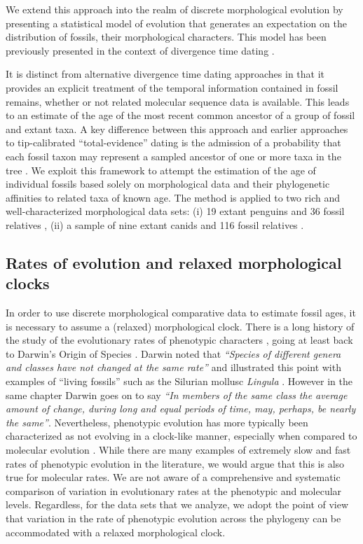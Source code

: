 \documentclass[11pt]{article}
\newcommand{\ncanidfossils}{{116}}
\begin{document}
We extend this approach into the realm of discrete morphological evolution by presenting a statistical model of evolution that generates an expectation on the distribution of fossils, their morphological characters. 
This model has been previously presented in the context of divergence time dating \cite{gavr2014,gavryushkina2015bayesian}. 

It is distinct from alternative divergence time dating approaches in that it provides an explicit treatment of the temporal information contained in fossil remains, whether or not related molecular sequence data is available. 
This leads to an estimate of the age of the most recent common ancestor of a group of fossil and extant taxa. A key difference between this approach and earlier approaches to tip-calibrated ``total-evidence'' dating \cite{Ronq2012} is the admission of a probability that each fossil taxon may represent a sampled ancestor of one or more taxa  in the tree \cite{gavr2014}.
We exploit this framework to attempt the estimation of the age of individual fossils based solely on morphological data and their phylogenetic affinities to related taxa of known age. 
The method is applied to two rich and well-characterized morphological data sets: (i) 
19 extant penguins and 36 fossil relatives \cite{ksepka2010,ksepka2012}, (ii) a sample of nine extant canids and \ncanidfossils{} fossil relatives \cite{Slater2015}.

\subsection*{Rates of evolution and relaxed morphological clocks}

In order to use discrete morphological comparative data to estimate fossil ages, it is necessary to assume a (relaxed) morphological clock. There is a long history of the study of the evolutionary rates of phenotypic characters \cite{Simpson1944,Haldane1949,Simpson1953,Gingerich1983,Gingerich1993}, going at least back to Darwin's Origin of Species \cite{Darwin1859}. Darwin noted that {\it ``Species of different genera and classes have not changed at the same rate''} and illustrated this point with examples of ``living fossils'' such as the Silurian mollusc {\it Lingula} \cite{Darwin1859}. However in the same chapter Darwin goes on to say {\it ``In members of the same class the average amount of change, during long and equal periods of time, may, perhaps, be nearly the same''}. Nevertheless, phenotypic evolution has more typically been characterized as not evolving in a clock-like manner, especially when compared to molecular evolution \cite{Kimura1983}. While there are many examples of extremely slow and fast rates of phenotypic evolution in the literature, we would argue that this is also true for molecular rates. We are not aware of a comprehensive and systematic comparison of variation in evolutionary rates at the phenotypic and molecular levels. Regardless, for the data sets that we analyze, we adopt the point of view that variation in the rate of phenotypic evolution across the phylogeny can be accommodated with a relaxed morphological clock.
\end{document}
